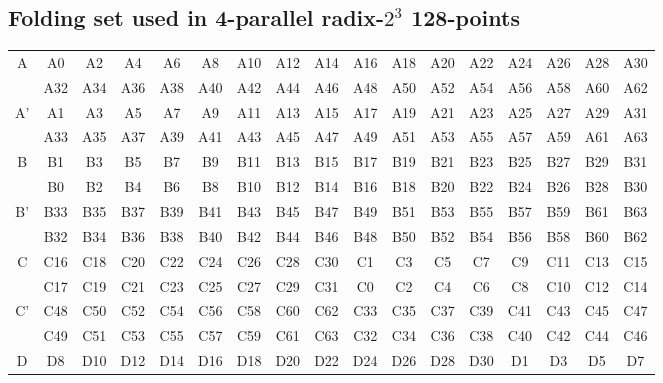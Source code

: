 \documentclass[journal,comsoc]{IEEEtran}
\begin{document}
\subsection{Folding set used in 4-parallel  radix-$2^3$ 128-points\label{sec:appen:folding_set_128}}
\begin{table}[htbp]
\centering
\begin{threeparttable}
\centering
\begin{tabular}{|c||cccccccccccccccc|}
 \hline

  \multirow{2}{*}{A} & A0 & A2 & A4 & A6 & A8 & A10 & A12 & A14 & A16 & A18 & A20 & A22 & A24 & A26 & A28 & A30 \\  

   & A32 & A34 & A36 & A38 & A40 & A42 & A44 & A46 & A48 & A50 & A52 & A54 & A56 & A58 & A60 & A62 \\  
\hline
  \multirow{2}{*}{A'} & A1 & A3 & A5 & A7 & A9 & A11 & A13 & A15 & A17 & A19 & A21 & A23 & A25 & A27 & A29 & A31 \\  

   & A33 & A35 & A37 & A39 & A41 & A43 & A45 & A47 & A49 & A51 & A53 & A55 & A57 & A59 & A61 & A63 \\  
\hline
  \multirow{2}{*}{B} & B1 & B3 & B5 & B7 & B9 & B11 & B13 & B15 & B17 & B19 & B21 & B23 & B25 & B27 & B29 & B31 \\  

   & B0 & B2 & B4 & B6 & B8 & B10 & B12 & B14 & B16 & B18 & B20 & B22 & B24 & B26 & B28 & B30 \\  
\hline
  \multirow{2}{*}{B'} & B33 & B35 & B37 & B39 & B41 & B43 & B45 & B47 & B49 & B51 & B53 & B55 & B57 & B59 & B61 & B63 \\  

   & B32 & B34 & B36 & B38 & B40 & B42 & B44 & B46 & B48 & B50 & B52 & B54 & B56 & B58 & B60 & B62 \\  
\hline
  \multirow{2}{*}{C} & C16 & C18 & C20 & C22 & C24 & C26 & C28 & C30 & C1 & C3 & C5 & C7 & C9 & C11 & C13 & C15 \\  

   & C17 & C19 & C21 & C23 & C25 & C27 & C29 & C31 & C0 & C2 & C4 & C6 & C8 & C10 & C12 & C14 \\  
\hline
  \multirow{2}{*}{C'} & C48 & C50 & C52 & C54 & C56 & C58 & C60 & C62 & C33 & C35 & C37 & C39 & C41 & C43 & C45 & C47 \\  

   & C49 & C51 & C53 & C55 & C57 & C59 & C61 & C63 & C32 & C34 & C36 & C38 & C40 & C42 & C44 & C46 \\  
\hline
  \multirow{2}{*}{D} & D8 & D10 & D12 & D14 & D16 & D18 & D20 & D22 & D24 & D26 & D28 & D30 & D1 & D3 & D5 & D7 \\  


\end{tabular}
\end{threeparttable}
\end{table}
\end{document}
